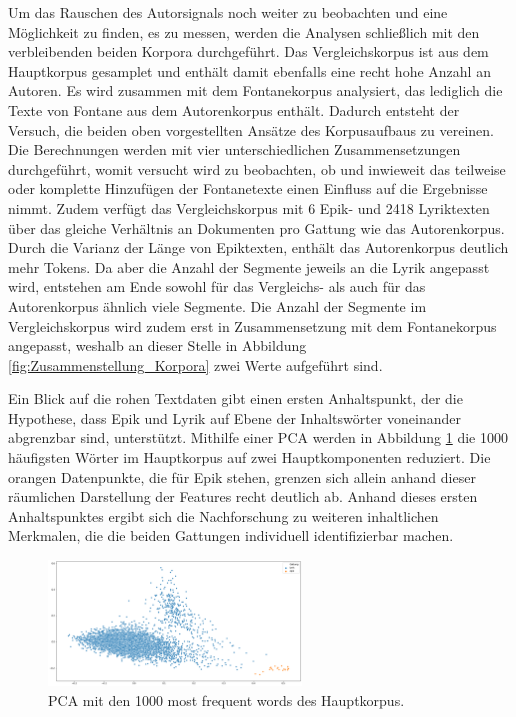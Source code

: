 \documentclass[a4paper,10p]{article}
\begin{document}
Um das Rauschen des Autorsignals noch weiter zu beobachten und eine Möglichkeit zu finden, es zu messen, werden die Analysen schließlich mit den verbleibenden beiden Korpora durchgeführt. Das Vergleichskorpus ist aus dem Hauptkorpus gesamplet und enthält damit ebenfalls eine recht hohe Anzahl an Autoren. Es wird zusammen mit dem Fontanekorpus analysiert, das lediglich die Texte von Fontane aus dem Autorenkorpus enthält. Dadurch entsteht der Versuch, die beiden oben vorgestellten Ansätze des Korpusaufbaus zu vereinen. Die Berechnungen werden mit vier unterschiedlichen Zusammensetzungen durchgeführt, womit versucht wird zu beobachten, ob und inwieweit das teilweise oder komplette Hinzufügen der Fontanetexte einen Einfluss auf die Ergebnisse nimmt. Zudem verfügt das Vergleichskorpus mit 6 Epik- und 2418 Lyriktexten über das gleiche Verhältnis an Dokumenten pro Gattung wie das Autorenkorpus. Durch die Varianz der Länge von Epiktexten, enthält das Autorenkorpus deutlich mehr Tokens. Da aber die Anzahl der Segmente jeweils an die Lyrik angepasst wird, entstehen am Ende sowohl für das Vergleichs- als auch für das Autorenkorpus ähnlich viele Segmente. Die Anzahl der Segmente im Vergleichskorpus wird zudem erst in Zusammensetzung mit dem Fontanekorpus angepasst, weshalb an dieser Stelle in Abbildung \ref{fig:Zusammenstellung_Korpora} zwei Werte aufgeführt sind. \par
 

Ein Blick auf die rohen Textdaten gibt einen ersten Anhaltspunkt, der die Hypothese, dass Epik und Lyrik auf Ebene der Inhaltswörter voneinander abgrenzbar sind, unterstützt. Mithilfe einer PCA werden in Abbildung \ref{fig:PCA_mfw} die 1000 häufigsten Wörter im Hauptkorpus auf zwei Hauptkomponenten reduziert. Die orangen Datenpunkte, die für Epik stehen, grenzen sich allein anhand dieser räumlichen Darstellung der Features recht deutlich ab. Anhand dieses ersten Anhaltspunktes ergibt sich die Nachforschung zu weiteren inhaltlichen Merkmalen, die die beiden Gattungen individuell identifizierbar machen.\par 

\begin{figure}
	\includegraphics[width=0.6\textwidth]{pca_mfw.png}
	\caption{PCA mit den 1000 most frequent words des Hauptkorpus.}
	\label{fig:PCA_mfw}
\end{figure}
\end{document}
